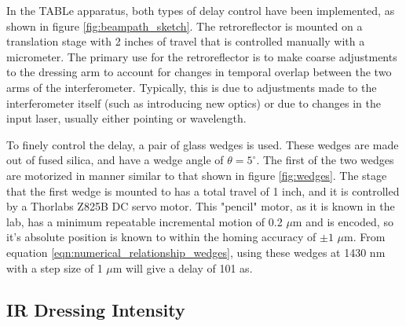 In the TABLe apparatus, both types of delay control have been implemented, as shown in figure \ref{fig:beampath_sketch}.  The retroreflector is mounted on a translation stage with 2 inches of travel that is controlled manually with a micrometer.  The primary use for the retroreflector is to make coarse adjustments to the dressing arm to account for changes in temporal overlap between the two arms of the interferometer.  Typically, this is due to adjustments made to the interferometer itself (such as introducing new optics) or due to changes in the input laser, usually either pointing or wavelength.  

To finely control the delay, a pair of glass wedges is used.  These wedges are made out of fused silica, and have a wedge angle of $\theta=5^\circ$.  The first of the two wedges are motorized in manner similar to that shown in figure \ref{fig:wedges}.  The stage that the first wedge is mounted to has a total travel of 1 inch, and it is controlled by a Thorlabs Z825B DC servo motor.  This "pencil" motor, as it is known in the lab, has a minimum repeatable incremental motion of 0.2 $\mu$m and is encoded, so it's absolute position is known to within the homing accuracy of $\pm1$ $\mu$m.  From equation \ref{eqn:numerical_relationship_wedges}, using these wedges at 1430 nm with a step size of 1 $\mu$m will give a delay of 101 as.


\subsection{IR Dressing Intensity}
\label{sec:dressing_intensity}

